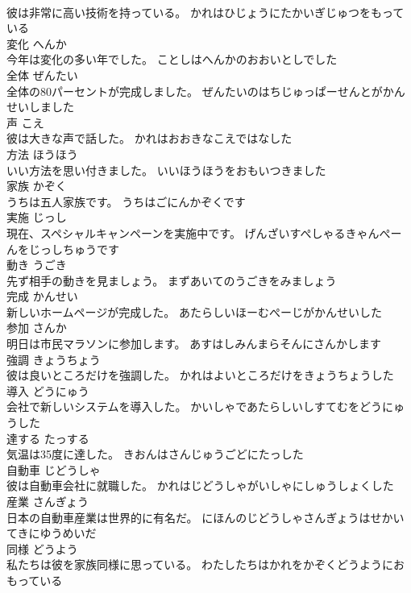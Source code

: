 \documentclass[8pt]{extreport}
\begin{document}
\begin{CJK}{UTF8}{min}
\\	彼は非常に高い技術を持っている。	かれはひじょうにたかいぎじゅつをもっている	
\\	変化	へんか	
\\	今年は変化の多い年でした。	ことしはへんかのおおいとしでした	
\\	全体	ぜんたい	
\\	全体の80パーセントが完成しました。	ぜんたいのはちじゅっぱーせんとがかんせいしました	
\\	声	こえ	
\\	彼は大きな声で話した。	かれはおおきなこえではなした	
\\	方法	ほうほう	
\\	いい方法を思い付きました。	いいほうほうをおもいつきました	
\\	家族	かぞく	
\\	うちは五人家族です。	うちはごにんかぞくです	
\\	実施	じっし	
\\	現在、スペシャルキャンペーンを実施中です。	げんざいすぺしゃるきゃんぺーんをじっしちゅうです	
\\	動き	うごき	
\\	先ず相手の動きを見ましょう。	まずあいてのうごきをみましょう	
\\	完成	かんせい	
\\	新しいホームページが完成した。	あたらしいほーむぺーじがかんせいした	
\\	参加	さんか	
\\	明日は市民マラソンに参加します。	あすはしみんまらそんにさんかします	
\\	強調	きょうちょう	
\\	彼は良いところだけを強調した。	かれはよいところだけをきょうちょうした	
\\	導入	どうにゅう	
\\	会社で新しいシステムを導入した。	かいしゃであたらしいしすてむをどうにゅうした	
\\	達する	たっする	
\\	気温は35度に達した。	きおんはさんじゅうごどにたっした	
\\	自動車	じどうしゃ	
\\	彼は自動車会社に就職した。	かれはじどうしゃがいしゃにしゅうしょくした	
\\	産業	さんぎょう	
\\	日本の自動車産業は世界的に有名だ。	にほんのじどうしゃさんぎょうはせかいてきにゆうめいだ	
\\	同様	どうよう	
\\	私たちは彼を家族同様に思っている。	わたしたちはかれをかぞくどうようにおもっている	

\end{CJK}
\end{document}
